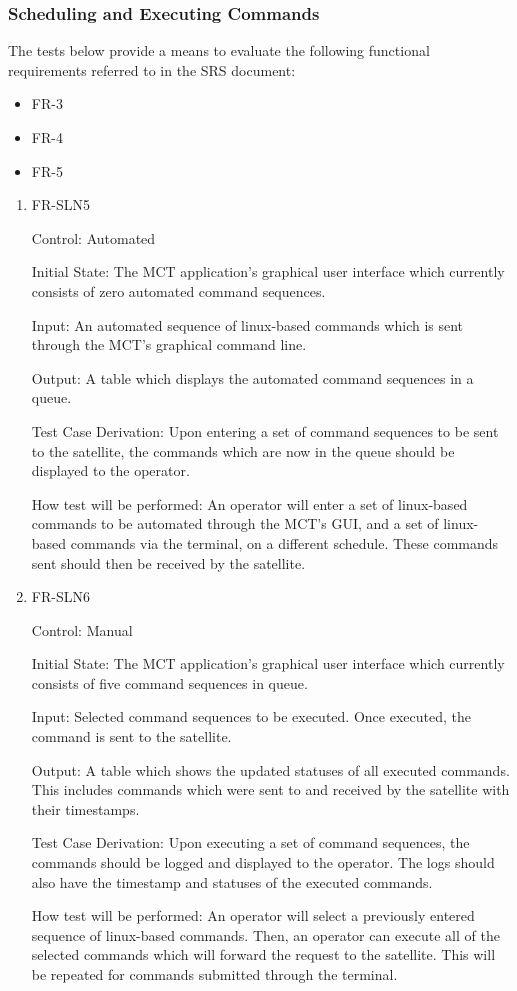 \documentclass[12pt, titlepage]{article}
\begin{document}
\subsubsection{Scheduling and Executing Commands}

The tests below provide a means to evaluate the following functional requirements referred to in the SRS document:
\begin{itemize}
    \item FR-3
    \item FR-4
    \item FR-5
\end{itemize}
		

\begin{enumerate}

\item{FR-SLN5\\}

Control: Automated
					
Initial State: The MCT application’s graphical user interface which currently consists of zero automated command sequences.
					
Input: An automated sequence of linux-based commands which is sent through the MCT’s graphical command line.
					
Output: A table which displays the automated command sequences in a queue.

Test Case Derivation: Upon entering a set of command sequences to be sent to the satellite, the commands which are now in the queue should be displayed to the operator.
					
How test will be performed: 
An operator will enter a set of linux-based commands to be automated through the MCT’s GUI, and a set of linux-based commands via the terminal, on a different schedule. These commands sent should then be received by the satellite.

\item{FR-SLN6\\}

Control: Manual
					
Initial State: The MCT application’s graphical user interface which currently consists of five command sequences in queue.

Input: Selected command sequences to be executed. Once executed, the command is sent to the satellite.

Output: 
A table which shows the updated statuses of all executed commands. This includes commands which were sent to and received by the satellite with their timestamps.

Test Case Derivation: Upon executing a set of command sequences, the commands should be logged and displayed to the operator. The logs should also have the timestamp and statuses of the executed commands.
					
How test will be performed: 
An operator will select a previously entered sequence of linux-based commands. Then, an operator can execute all of the selected commands which will forward the request to the satellite. This will be repeated for commands submitted through the terminal.

\end{enumerate}
\end{document}
